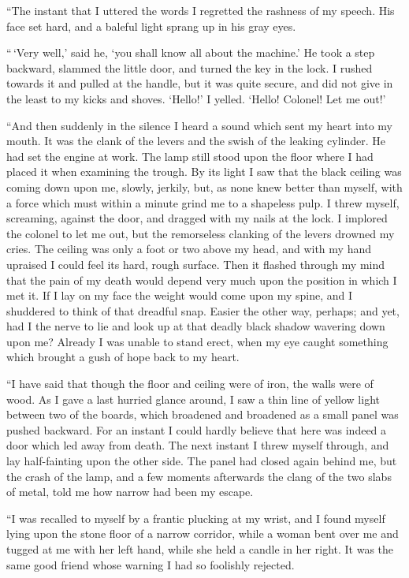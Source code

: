 “The instant that I uttered the words I regretted the rashness
of my speech. His face set hard, and a baleful light
sprang up in his gray eyes.

“\,‘Very well,’ said he, ‘you shall know all about the machine.’
He took a step backward, slammed the little door,
and turned the key in the lock. I rushed towards it and
pulled at the handle, but it was quite secure, and did not give
in the least to my kicks and shoves. ‘Hello!’ I yelled.
‘Hello! Colonel! Let me out!’

“And then suddenly in the silence I heard a sound which
sent my heart into my mouth. It was the clank of the levers
and the swish of the leaking cylinder. He had set the engine
at work. The lamp still stood upon the floor where I had
placed it when examining the trough. By its light I saw that
the black ceiling was coming down upon me, slowly, jerkily,
but, as none knew better than myself, with a force which must
within a minute grind me to a shapeless pulp. I threw
myself, screaming, against the door, and dragged with my nails
at the lock. I implored the colonel to let me out, but the
remorseless clanking of the levers drowned my cries. The
ceiling was only a foot or two above my head, and with my
hand upraised I could feel its hard, rough surface. Then it
flashed through my mind that the pain of my death would
depend very much upon the position in which I met it. If I
lay on my face the weight would come upon my spine, and I
shuddered to think of that dreadful snap. Easier the other
way, perhaps; and yet, had I the nerve to lie and look up at
that deadly black shadow wavering down upon me? Already
I was unable to stand erect, when my eye caught something
which brought a gush of hope back to my heart.

“I have said that though the floor and ceiling were of iron,
the walls were of wood. As I gave a last hurried glance
around, I saw a thin line of yellow light between two of the
boards, which broadened and broadened as a small panel was
pushed backward. For an instant I could hardly believe that
here was indeed a door which led away from death. The
next instant I threw myself through, and lay half-fainting upon
the other side. The panel had closed again behind me, but
the crash of the lamp, and a few moments afterwards the clang
of the two slabs of metal, told me how narrow had been my
escape.

“I was recalled to myself by a frantic plucking at my wrist,
and I found myself lying upon the stone floor of a narrow corridor,
while a woman bent over me and tugged at me with her
left hand, while she held a candle in her right. It was the
same good friend whose warning I had so foolishly rejected.

